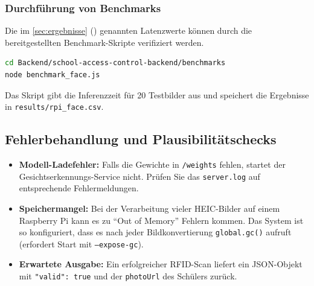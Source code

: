 \subsubsection{Durchführung von Benchmarks}
Die im \autoref{sec:ergebnisse} () genannten Latenzwerte können durch die bereitgestellten Benchmark-Skripte verifiziert werden.
\begin{lstlisting}[language=bash]
cd Backend/school-access-control-backend/benchmarks
node benchmark_face.js
\end{lstlisting}
Das Skript gibt die Inferenzzeit für 20 Testbilder aus und speichert die Ergebnisse in \texttt{results/rpi\_face.csv}.

\subsection{Fehlerbehandlung und Plausibilitätschecks}
\begin{itemize}
  \item \textbf{Modell-Ladefehler:} Falls die Gewichte in \texttt{/weights} fehlen, startet der Gesichtserkennungs-Service nicht. Prüfen Sie das \texttt{server.log} auf entsprechende Fehlermeldungen.
  \item \textbf{Speichermangel:} Bei der Verarbeitung vieler HEIC-Bilder auf einem Raspberry Pi kann es zu \enquote{Out of Memory} Fehlern kommen. Das System ist so konfiguriert, dass es nach jeder Bildkonvertierung \texttt{global.gc()} aufruft (erfordert Start mit \texttt{--expose-gc}).
  \item \textbf{Erwartete Ausgabe:} Ein erfolgreicher RFID-Scan liefert ein JSON-Objekt mit \texttt{"valid": true} und der \texttt{photoUrl} des Schülers zurück.
\end{itemize}
